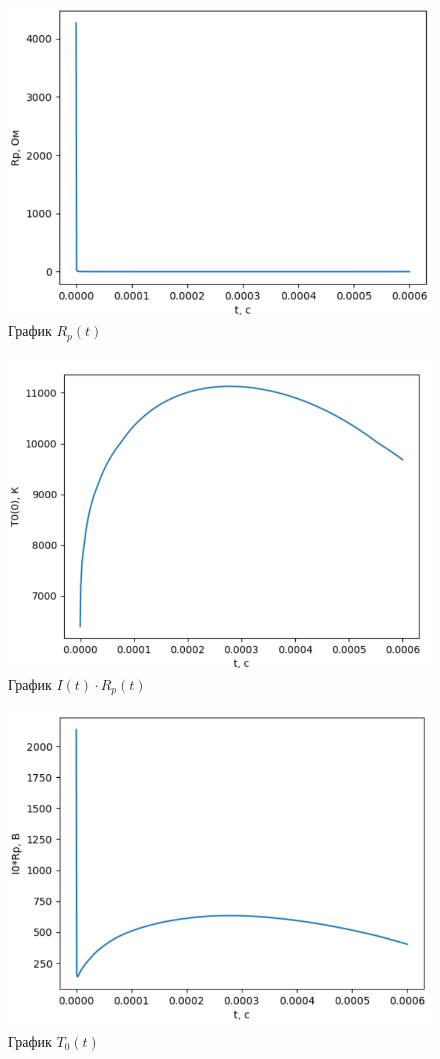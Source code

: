 \begin{figure}[h]
	
	\includegraphics[scale=0.45]{img/3.png}
	\caption{График $R_p(t)$}
\end{figure}
\newpage
\begin{figure}[h]
	\includegraphics[scale=0.45]{img/4.png}
	\caption{График $I(t)\cdot R_p(t)$}
\end{figure}
\begin{figure}[h!]
	\includegraphics[scale=0.45]{img/5.png}
	\caption{График $T_0(t)$}
\end{figure}
